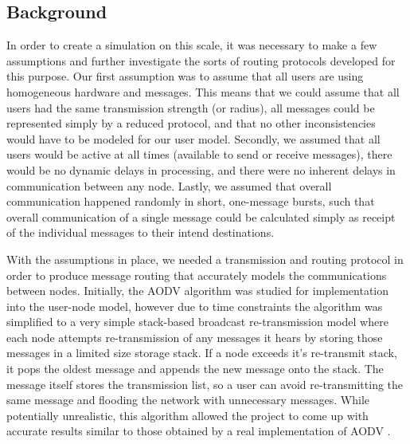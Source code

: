 \subsection{Background}
In order to create a simulation on this scale, it was necessary to make a few assumptions
and further investigate the sorts of routing protocols developed for this purpose.
Our first assumption was to assume that all users are using homogeneous hardware and messages.
This means that we could assume that all users had the same transmission strength (or radius),
all messages could be represented simply by a reduced protocol, and that no other inconsistencies
would have to be modeled for our user model.
Secondly, we assumed that all users would be active at all times (available to send or receive
messages), there would be no dynamic delays in processing, and there were no inherent delays in
communication between any node.
Lastly, we assumed that overall communication happened randomly in short, one-message bursts,
such that overall communication of a single message could be calculated simply as receipt of the
individual messages to their intend destinations.

With the assumptions in place, we needed a transmission and routing protocol in order to produce
message routing that accurately models the communications between nodes.
Initially, the AODV algorithm \cite{perkins99,royer00} was studied for implementation into the
user-node model, however due to time constraints the algorithm was simplified to a very simple
stack-based broadcast re-transmission model where each node attempts re-transmission of any
messages it hears by storing those messages in a limited size storage stack.
If a node exceeds it's re-transmit stack, it pops the oldest message and appends the new message 
onto the stack.
The message itself stores the transmission list, so a user can avoid re-transmitting the same
message and flooding the network with unnecessary messages.
While potentially unrealistic, this algorithm allowed the project to come up with accurate
results similar to those obtained by a real implementation of AODV \cite{morshed08}.
